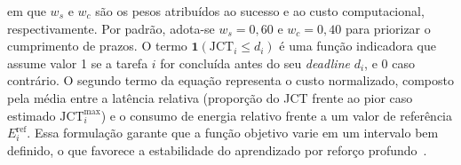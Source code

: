 em que $w_s$ e $w_c$ são os pesos atribuídos ao sucesso e ao custo computacional, respectivamente. Por padrão, adota-se $w_s = 0{,}60$ e $w_c = 0{,}40$ para priorizar o cumprimento de prazos. O termo $\mathbf{1}(\text{JCT}_i \leq d_i)$ é uma função indicadora que assume valor 1 se a tarefa $i$ for concluída antes do seu \textit{deadline} $d_i$, e 0 caso contrário. O segundo termo da equação representa o custo normalizado, composto pela média entre a latência relativa (proporção do \gls{JCT} frente ao pior caso estimado $\text{JCT}^{\max}_i$) e o consumo de energia relativo frente a um valor de referência $E^{\text{ref}}_i$. Essa formulação garante que a função objetivo varie em um intervalo bem definido, o que favorece a estabilidade do aprendizado por reforço profundo~\cite{haarnoja2018sac, uddin2025}.
